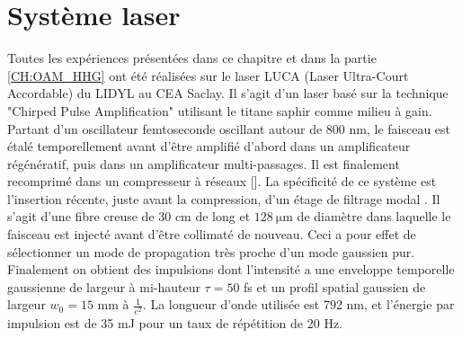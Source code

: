 \section{Système laser}
\label{sec:laser}
Toutes les expériences présentées dans ce chapitre et dans la partie \ref{CH:OAM_HHG} ont été réalisées sur le laser LUCA (Laser Ultra-Court Accordable) du LIDYL au CEA Saclay. Il s'agit d'un laser basé sur la technique "Chirped Pulse Amplification" utilisant le titane saphir comme milieu à gain. Partant d'un oscillateur femtoseconde oscillant autour de 800 nm, le faisceau est étalé temporellement avant d'être amplifié d'abord dans un amplificateur régénératif, puis dans un amplificateur multi-passages. Il est finalement recomprimé dans un compresseur à réseaux []. La spécificité de ce système est l'insertion récente, juste avant la compression, d'un étage de filtrage modal . Il s'agit d'une fibre creuse de 30 cm de long et $\SI{128}{\micro\metre}$ de diamètre dans laquelle le faisceau est injecté avant d'être collimaté de nouveau. Ceci a pour effet de sélectionner un mode de propagation très proche d'un mode gaussien pur. Finalement on obtient des impulsions dont l'intensité a une enveloppe temporelle gaussienne de largeur à mi-hauteur $\tau = 50$ fs et un profil spatial gaussien de largeur $w_0 = 15$ mm à $\frac{1}{e^2}$. La longueur d'onde utilisée est 792 nm, et l'énergie par impulsion est de 35 mJ pour un taux de répétition de 20 Hz. 

